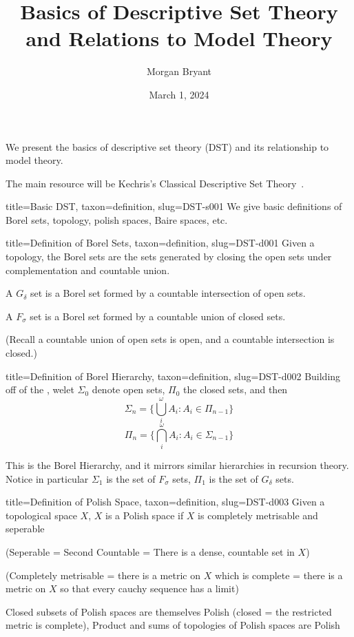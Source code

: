 \documentclass[a4paper]{article}
\title{Basics of Descriptive Set Theory and Relations to Model Theory}
\date{March 1, 2024}
\author{Morgan Bryant}
\begin{document}
\maketitle
\par{We present the basics of descriptive set theory (DST) and its relationship to model theory.}\par{The main resource will be Kechris's Classical Descriptive Set Theory~\cite{DST-r001}.}
\begin{tree}{title={Basic DST}, taxon={definition}, slug={DST-s001}}
We give basic definitions of Borel sets, topology, polish spaces, Baire spaces, etc.
\begin{tree}{title={Definition of Borel Sets}, taxon={definition}, slug={DST-d001}}
Given a topology, the Borel sets are the sets generated by closing the open sets under complementation and countable union.\par{A \(G_ \delta\) set is a Borel set formed by a countable intersection of open sets.}\par{A \(F_ \sigma\) set is a Borel set formed by a countable union of closed sets.}\par{(Recall a countable union of open sets is open, and a countable intersection is closed.)}
\end{tree}

\begin{tree}{title={Definition of Borel Hierarchy}, taxon={definition}, slug={DST-d002}}
Building off of the , welet \(\Sigma _0\) denote open sets, \(\Pi _0\) the closed sets, and then 
\[\Sigma _n =  \{ \bigcup _i^ \omega  A_i : A_i  \in   \Pi _{n-1} \}\]
\[\Pi _n =  \{ \bigcap _i^ \omega  A_i : A_i  \in   \Sigma _{n-1} \}\]\par{This is the Borel Hierarchy, and it mirrors similar hierarchies in recursion theory. 
Notice in particular \(\Sigma _1\) is the set of \(F_ \sigma\) sets, \(\Pi _1\) is the set of \(G_ \delta\) sets. }
\end{tree}

\begin{tree}{title={Definition of Polish Space}, taxon={definition}, slug={DST-d003}}
Given a topological space \(X\), \(X\) is a Polish space if \(X\) is completely metrisable and seperable\par{(Seperable = Second Countable = There is a dense, countable set in \(X\))}\par{(Completely metrisable = there is a metric on \(X\) which is complete = there is a metric on \(X\) so that every cauchy sequence 
has a limit)}\par{Closed subsets of Polish spaces are themselves Polish (closed = the restricted metric is complete), Product and sums of topologies of Polish spaces are Polish}
\end{tree}


\end{tree}
\end{document}
